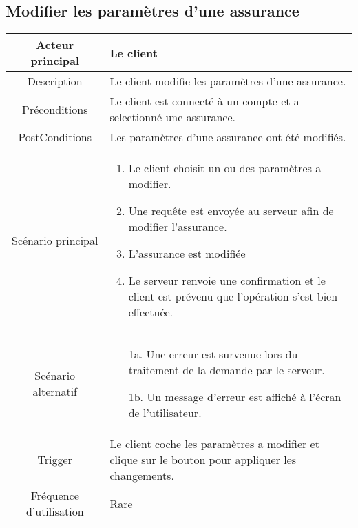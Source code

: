 \documentclass[]{article}
\begin{document}
\subsection{Modifier les paramètres d'une assurance}
\begin{table}[h]
    \begin{tabular}{|c|p{10cm}|}
       \hline
       Acteur principal&Le client\\
       \hline
       Description&Le client modifie les paramètres d'une assurance.\\
       \hline
       Préconditions&Le client est connecté à un compte et a selectionné une assurance.\\
       \hline
       PostConditions&Les paramètres d'une assurance ont été modifiés.\\
       \hline
       Scénario principal& 
             \begin{enumerate}
                \item Le client choisit un ou des paramètres a modifier.
                \item Une requête est envoyée au serveur afin de modifier l'assurance.
                \item L'assurance est modifiée
                \item Le serveur renvoie une confirmation et le client est prévenu que l'opération s'est bien effectuée.
             \end{enumerate}     \\
       \hline
       Scénario alternatif&   
       \begin{itemize}
        \item[1a.] Une erreur est survenue lors du traitement de la demande par le serveur.
        \item[1b.] Un message d'erreur est affiché à l'écran de l'utilisateur. 
    \end{itemize}
       \\
       \hline
       Trigger&Le client coche les paramètres a modifier et clique sur le bouton pour appliquer les changements.\\
       \hline
       Fréquence d'utilisation&Rare\\
       \hline
    \end{tabular}
 \end{table}

\newpage

\end{document}
